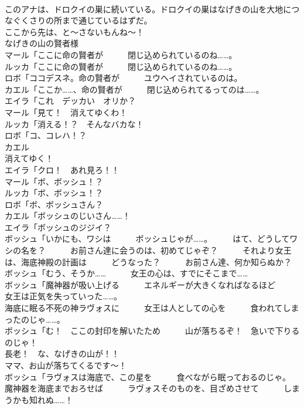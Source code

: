 \documentclass[8pt]{extreport}
\begin{document}
\begin{CJK}{UTF8}{min}
\\	このアナは、ドロクイの巣に続いている。ドロクイの巣はなげきの山を大地につなぐくさりの所まで通じているはずだ。	
\\	ここから先は、と～さないもんね～！	
\\	なげきの山の賢者様	
\\	マール「ここに命の賢者が　　　閉じ込められているのね……。	
\\	ルッカ「ここに命の賢者が　　　閉じ込められているのね……。	
\\	ロボ「ココデスネ。命の賢者が　　　ユウヘイされているのは。	
\\	カエル「ここか……、命の賢者が　　　閉じ込められてるってのは……。	
\\	エイラ「これ　デッカい　オリか？	
\\	マール「見て！　消えてゆくわ！	
\\	ルッカ「消える！？　そんなバカな！	
\\	ロボ「コ、コレハ！？	
\\	カエル
\\	消えてゆく！	
\\	エイラ「クロ！　あれ見ろ！！	
\\	マール「ボ、ボッシュ！？	
\\	ルッカ「ボ、ボッシュ！？	
\\	ロボ「ボ、ボッシュさん？	
\\	カエル「ボッシュのじいさん……！	
\\	エイラ「ボッシュのジジイ？	
\\	ボッシュ「いかにも、ワシは　　　ボッシュじゃが……。　　　はて、どうしてワシの名を？　　　お前さん達に会うのは、初めてじゃぞ？　　　それより女王は、海底神殿の計画は　　　どうなった？　　　お前さん達、何か知らぬか？	
\\	ボッシュ「むう、そうか……　　　女王の心は、すでにそこまで……	
\\	ボッシュ「魔神器が吸い上げる　　　エネルギーが大きくなればなるほど　　　女王は正気を失っていった……。	
\\	海底に眠る不死の神ラヴォスに　　　女王は人としての心を　　　食われてしまったのじゃ……。	
\\	ボッシュ「む！　ここの封印を解いたため　　　山が落ちるぞ！　急いで下りるのじゃ！	
\\	長老！　な、なげきの山が！！	
\\	ママ、お山が落ちてくるです～！	
\\	ボッシュ「ラヴォスは海底で、この星を　　　食べながら眠っておるのじゃ。　　　魔神器を海底までおろせば　　　ラヴォスそのものを、目ざめさせて　　　しまうかも知れぬ……！	

\end{CJK}
\end{document}
